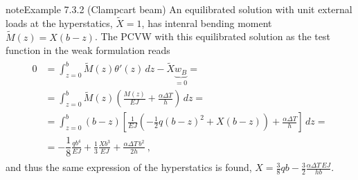 \documentclass[letterpaper,10pt,english]{jupyterBook}
\begin{document}
\begin{sphinxadmonition}{note}{Example 7.3.2 (Clamp\sphinxhyphen{}cart beam)}
\sphinxAtStartPar
{} An equilibrated solution with unit external loads at the hyperstatics, \(\widetilde{X} = 1\), has intenral bending moment \(\widetilde{M}(z) = X ( b - z)\). The PCVW with this equilibrated solution as the test function in the weak formulation reads
\begin{equation*}
\begin{split}\begin{aligned}
  0
  & = \int_{z=0}^{b} \widetilde{M}(z) \theta'(z) \, dz - \widetilde{X} \underbrace{w_B}_{=0} = \\
  & = \int_{z=0}^{b} \widetilde{M}(z) \left( \frac{M(z)}{EJ} + \frac{\alpha \Delta T}{h} \right) \, dz = \\
  & = \int_{z=0}^{b} \left( b - z \right) \left[ \frac{1}{EJ} \left( -\frac{1}{2} q (b-z)^2 + X(b-z) \right) + \frac{\alpha \Delta T}{h} \right] \, dz = \\
  & = - \dfrac{1}{8} \frac{qb^4}{EJ} + \frac{1}{3}\frac{Xb^3}{EJ} + \frac{\alpha \Delta T \, b^2}{2 h} \ ,
\end{aligned}\end{split}
\end{equation*}
\sphinxAtStartPar
and thus the same expression of the hyperstatics is found, \(X = \frac{3}{8} qb - \frac{3}{2} \frac{\alpha \Delta T \, EJ}{hb}\).


\end{sphinxadmonition}
\end{document}
